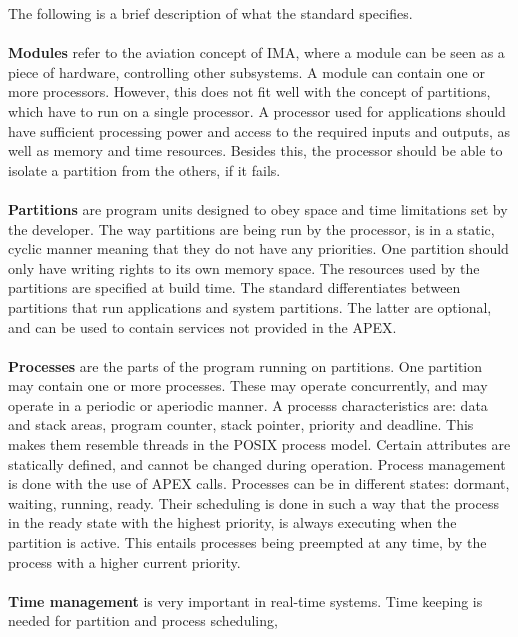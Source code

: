 The following is a brief description of what the standard specifies.
\\\\
\textbf{Modules}
refer to the aviation concept of IMA, where a module
can be seen as a piece of hardware, controlling other subsystems.
A module can contain one or more processors. However, this does not fit
well with the concept of partitions,
which have to run on a single processor\cite{arinc_page_11}.
A processor used for \arinc{} applications should have sufficient processing
power and access to the required inputs and outputs,
as well as memory and time resources.
Besides this, the processor should be able to isolate a partition from
the others, if it fails\cite{arinc_page_12}.
\\\\
\textbf{Partitions}
are program units designed to obey space and time limitations
set by the developer. The way partitions are being run by the processor,
is in a static, cyclic manner meaning that they do not have any priorities.
One partition should only have writing rights to its own memory space\cite{arinc_page_13}.
The resources used by the partitions are specified at build time\cite{arinc_page_14}.
The standard differentiates between partitions that run applications and system partitions. The latter are optional, and can be used to contain
services not provided in the APEX\cite{arinc_scarlett}.
\\\\
\textbf{Processes}
are the parts of the program running on partitions. One partition
may contain one or more processes. These may operate concurrently,
and may operate in a periodic or aperiodic manner.
A process\textquotesingle s
characteristics are: data and stack areas, program counter, stack pointer,
priority and deadline. This makes them resemble threads in the POSIX\cite{posix} process model.
Certain attributes are statically defined, and cannot
be changed during operation\cite{arinc_page_19}.
Process management is done with the use of APEX calls.
Processes can be in different states: dormant, waiting, running, ready.
Their scheduling is done in such a way that the process in the ready state
with the highest priority, is always executing when the partition is active.
This entails processes being preempted at any time, by the process with a
higher current priority\cite{arinc_page_20}.
\\\\
\textbf{Time management}
is very important in real-time systems.
Time keeping is needed for partition and process scheduling,
